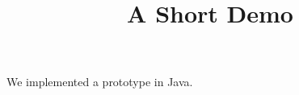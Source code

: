 \documentclass[article]{jss}
\title{A Short Demo}
\begin{document}
We implemented a prototype in Java.
\end{document}
